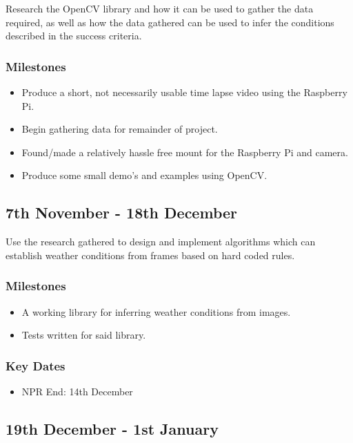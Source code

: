 \documentclass[12pt]{article}
\begin{document}
Research the OpenCV library and how it can be used to gather the data required, as well as how the data gathered can be used to infer the conditions described in the success criteria.

\subsubsection*{Milestones}
\begin{itemize}
	\item Produce a short, not necessarily usable time lapse video using the Raspberry Pi.
	\item Begin gathering data for remainder of project.
	\item Found/made a relatively hassle free mount for the Raspberry Pi and camera.
	\item Produce some small demo's and examples using OpenCV.
\end{itemize}

\subsection*{7th November - 18th December}%

Use the research gathered to design and implement algorithms which can establish weather conditions from frames based on hard coded rules.

\subsubsection*{Milestones}
\begin{itemize}
	\item A working library for inferring weather conditions from images.
	\item Tests written for said library.
\end{itemize}

\subsubsection*{Key Dates}
\begin{itemize}
	\item NPR End: 14th December
\end{itemize}

\subsection*{19th December - 1st January}%
\end{document}
